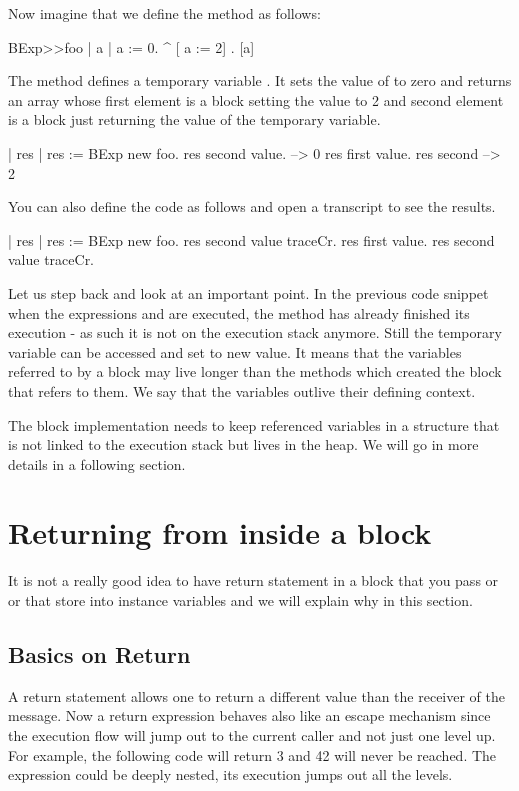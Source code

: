 \documentclass[a4paper,10pt,twoside]{book}
\begin{document}
Now imagine that we define the method  as follows:

\begin{code}{}
BExp>>foo
	| a |
	a := 0. 
	^ {[ a := 2] . [a]} 
\end{code}

The method  defines a temporary variable . It sets the value of 
to zero and returns an array whose first element is a block setting the value to 2 and second element is a block just returning the value of the temporary variable. 

\begin{code}{}
| res | 
res := BExp new foo.
res second value.
     --> 0
res first value.
res second
     --> 2
\end{code}

You can also define the code as follows and open a transcript to see the results.

\begin{code}
| res |
res := BExp new foo.
res second value traceCr.
res first value.
res second value traceCr.
\end{code}

Let us step back and look at an important point. 
In the previous code snippet when the expressions  and  are executed, the method  has already finished its execution - as such it is not on the execution stack anymore.  Still the temporary variable  can be accessed and set to new value. It means that the variables referred to by a block may live longer than the methods which created the block that refers to them. We say that the variables outlive their defining context. 

The block implementation needs to keep referenced variables in a structure that is not linked to the execution stack but lives in the heap. We will go in more details in a following section. 





\section{Returning from inside a block}
It is not a really good idea to have return statement in a block that you pass or or that store into instance variables and we will explain why in this section.

\subsection{Basics on Return}
A return statement allows one to return a different value than the receiver of the message.
Now a return expression behaves also like an escape mechanism since the execution flow will jump out to the current caller and not just one level up. For example, the following code will return 3 and 42 will never be reached. The expression \ct{[ ^3 ]} could be deeply nested, its execution jumps out all the levels.
\end{document}
